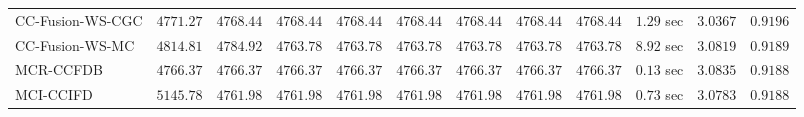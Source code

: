 \begin{table}[H]
\begin{tabular}{lrrrrrrrrrrr}
    CC-Fusion-WS-CGC & $      4771.27$ & $      4768.44$ & $      4768.44$ & $      4768.44$ & $      4768.44$ & $      4768.44$ & $      4768.44$ & $      4768.44$ & $         1.29$ sec    & $       3.0367$  & $       0.9196$ \\ 
     CC-Fusion-WS-MC & $      4814.81$ & $      4784.92$ & $      4763.78$ & $      4763.78$ & $      4763.78$ & $      4763.78$ & $      4763.78$ & $      4763.78$ & $         8.92$ sec    & $       3.0819$  & $       0.9189$ \\ 
\cmidrule{1-1} 
           MCR-CCFDB & $      4766.37$ & $      4766.37$ & $      4766.37$ & $      4766.37$ & $      4766.37$ & $      4766.37$ & $      4766.37$ & $      4766.37$ & $         0.13$ sec    & $       3.0835$  & $       0.9188$ \\ 
\cmidrule{1-1} 
           MCI-CCIFD & $      5145.78$ & $      4761.98$ & $      4761.98$ & $      4761.98$ & $      4761.98$ & $      4761.98$ & $      4761.98$ & $      4761.98$ & $         0.73$ sec    & $       3.0783$  & $       0.9188$ \\ 
\bottomrule
\end{tabular}
\end{table}

